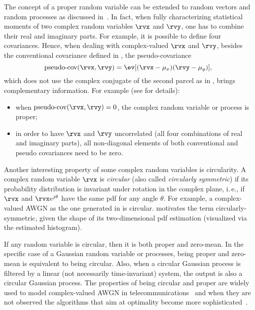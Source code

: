 The concept of a proper random variable can be extended to random vectors and random processes as discussed in~\cite{Neeser93}.
In fact, when fully characterizing statistical moments of two complex random variables $\rvx$ and $\rvy$, one has to combine their real and imaginary parts. For example, it is possible to define  four covariances. Hence, when dealing with complex-valued $\rvx$ and $\rvy$, besides the conventional covariance defined in , the pseudo-covariance
\[
\textrm{pseudo-cov}(\rvx,\rvy) = \ev[ (\rvx - \mu_x) (\rvy - \mu_y)],
\]
which does not use the complex conjugate of the second parcel as in , brings complementary information. For example (see \cite{Neeser93} for details):
\begin{itemize}
	\item when $\textrm{pseudo-cov}(\rvx,\rvy) = 0$, the complex random variable or process is proper;
	\item in order to have $\rvx$ and $\rvy$ uncorrelated (all four combinations
of real and imaginary parts), all non-diagonal elements of both conventional and pseudo covariances need to be zero.
\end{itemize}

Another interesting property of some complex random variables is circularity. A complex random variable $\rvx$ is \emph{circular} (also called \emph{circularly symmetric}) if its probability distribution is invariant under rotation in the complex plane, i.\,e., if $\rvx$ and $\rvx e^{j \theta}$ have the same pdf for any angle $\theta$.
For example, a complex-valued AWGN as the one generated in  is
circular. 
 motivates the term circularly-symmetric, given the shape of its two-dimensional pdf estimation (visualized via the estimated histogram).

If any random variable is circular, then it is both proper and zero-mean. In
the specific case of a Gaussian random variable or
processes, being proper and zero-mean is equivalent to being circular. Also, when
a circular Gaussian process is filtered by a linear (not
necessarily time-invariant) system, the output is also a circular Gaussian process.
The properties of being circular and proper are widely used to model complex-valued AWGN in telecommunications~\cite{Proakis07} and when they are not observed the algorithms that
aim at optimality become more sophisticated~\cite{Neeser93,Adali11}.

